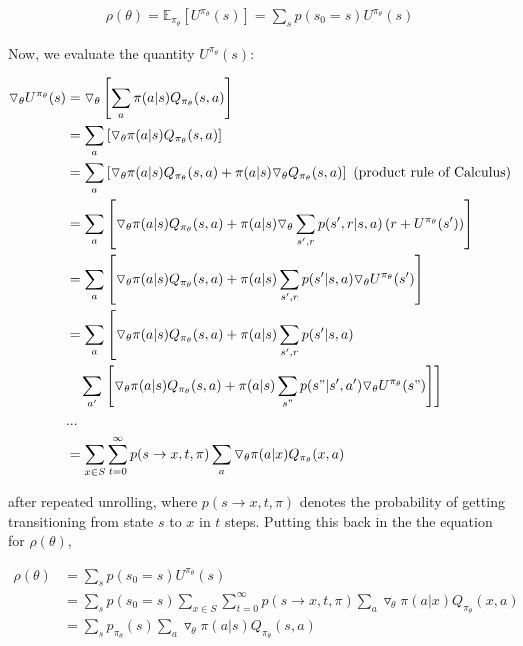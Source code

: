 \documentclass[11pt]{article}
\begin{document}
$$
\begin{aligned}
\rho(\theta) = \mathbb{E}_{\pi_{\theta}}[U^{\pi_{\theta}}(s)] = \sum_s p(s_0 = s) U^{\pi_{\theta}}(s)
\end{aligned}
$$

Now, we evaluate the quantity $U^{\pi_{\theta}}(s)$:

$$
\begin{aligned}
\triangledown_{\theta} U^{\pi_{\theta}}(s) &= \triangledown_{\theta} \left[ \sum_a \pi(a|s) Q_{\pi_{\theta}}(s, a) \right]\\
&= \sum_a \left[ \triangledown_{\theta} \pi(a|s) Q_{\pi_{\theta}}(s, a) \right]\\
&= \sum_a \left[ \triangledown_{\theta} \pi(a|s) Q_{\pi_{\theta}}(s, a) + \pi(a|s) \triangledown_{\theta} Q_{\pi_{\theta}}(s, a)  \right] \text{ (product rule of Calculus)}\\
&= \sum_a \left[ \triangledown_{\theta} \pi(a|s) Q_{\pi_{\theta}}(s, a) + \pi(a|s) \triangledown_{\theta} \sum_{s', r} p(s', r |s, a)\left( r +  U^{\pi_{\theta}}(s') \right) \right]\\
&= \sum_a \left[ \triangledown_{\theta} \pi(a|s) Q_{\pi_{\theta}}(s, a) + \pi(a|s) \sum_{s', r} p(s' |s, a)\triangledown_{\theta} U^{\pi_{\theta}}(s') \right]\\
&= \sum_a \left[ \triangledown_{\theta} \pi(a|s) Q_{\pi_{\theta}}(s, a) + \pi(a|s) \sum_{s', r} p(s' |s, a) \right.\\ 
&\quad \sum_{a'} \left. \left[ \triangledown_{\theta} \pi(a|s) Q_{\pi_{\theta}}(s, a) + \pi(a|s) \sum_{s"} p(s" | s', a') \triangledown_{\theta} U^{\pi_{\theta}}(s") \right] \right]\\
&...\\
&= \sum_{x \in S} \sum^{\infty}_{t=0} p(s \rightarrow x, t, \pi) \sum_a \triangledown_{\theta}\pi(a | x) Q_{\pi_{\theta}}(x, a)
\end{aligned}
$$

after repeated unrolling, where $p(s \rightarrow x, t, \pi)$ denotes the probability of getting transitioning from state $s$ to $x$ in $t$ steps. Putting this back in the the equation for $\rho(\theta)$,

$$
\begin{aligned}
\rho(\theta) &= \sum_s p(s_0 = s) U^{\pi_{\theta}}(s)\\
&= \sum_s p(s_0 = s) \sum_{x \in S} \sum^{\infty}_{t=0} p(s \rightarrow x, t, \pi) \sum_a \triangledown_{\theta}\pi(a | x) Q_{\pi_{\theta}}(x, a)\\
&= \sum_s p_{\pi_{\theta}}(s)\sum_a \triangledown_{\theta}\pi(a | s) Q_{\pi_{\theta}}(s, a)
\end{aligned}
$$
\end{document}
